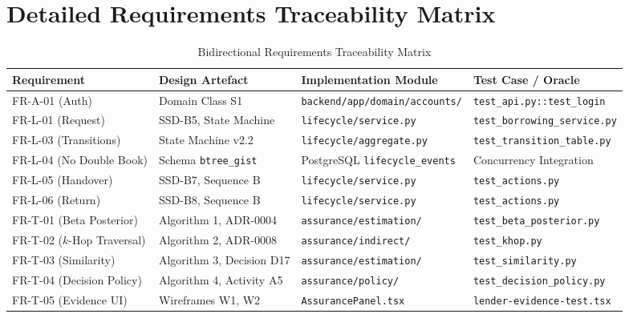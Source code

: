 \chapter{Detailed Requirements Traceability Matrix}
\label{app:requirements_matrix}

\begin{table}[htbp]
\centering
\caption{Bidirectional Requirements Traceability Matrix}
\label{tab:traceability_matrix}
\small
\begin{tabularx}{\textwidth}{l l l l}
\toprule
\textbf{Requirement} & \textbf{Design Artefact} & \textbf{Implementation Module} & \textbf{Test Case / Oracle} \\
\midrule
FR-A-01 (Auth) & Domain Class S1 & \texttt{backend/app/domain/accounts/} & \texttt{test\_api.py::test\_login} \\
FR-L-01 (Request) & SSD-B5, State Machine & \texttt{lifecycle/service.py} & \texttt{test\_borrowing\_service.py} \\
FR-L-03 (Transitions) & State Machine v2.2 & \texttt{lifecycle/aggregate.py} & \texttt{test\_transition\_table.py} \\
FR-L-04 (No Double Book)& Schema \texttt{btree\_gist} & PostgreSQL \texttt{lifecycle\_events} & Concurrency Integration \\
FR-L-05 (Handover) & SSD-B7, Sequence B & \texttt{lifecycle/service.py} & \texttt{test\_actions.py} \\
FR-L-06 (Return) & SSD-B8, Sequence B & \texttt{lifecycle/service.py} & \texttt{test\_actions.py} \\
FR-T-01 (Beta Posterior)& Algorithm 1, ADR-0004 & \texttt{assurance/estimation/} & \texttt{test\_beta\_posterior.py} \\
FR-T-02 ($k$-Hop Traversal)& Algorithm 2, ADR-0008 & \texttt{assurance/indirect/} & \texttt{test\_khop.py} \\
FR-T-03 (Similarity) & Algorithm 3, Decision D17 & \texttt{assurance/estimation/} & \texttt{test\_similarity.py} \\
FR-T-04 (Decision Policy)& Algorithm 4, Activity A5 & \texttt{assurance/policy/} & \texttt{test\_decision\_policy.py} \\
FR-T-05 (Evidence UI) & Wireframes W1, W2 & \texttt{AssurancePanel.tsx} & \texttt{lender-evidence-test.tsx} \\
\bottomrule
\end{tabularx}
\end{table}
